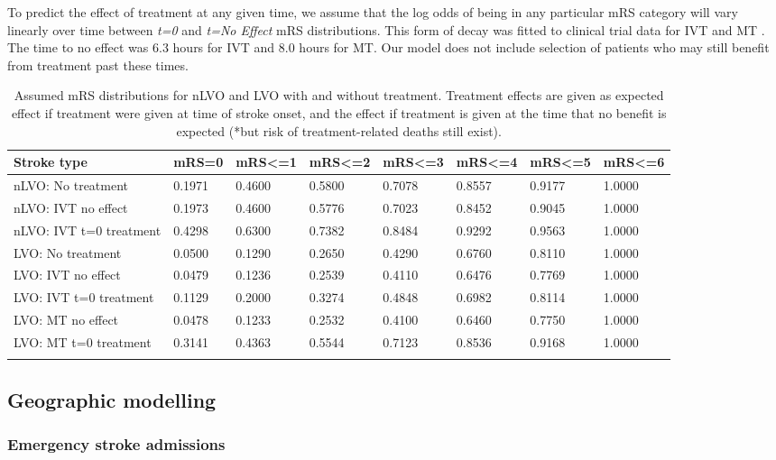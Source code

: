 To predict the effect of treatment at any given time, we assume that the log odds of being in any particular mRS category will vary linearly over time between \textit{t=0} and \textit{t=No Effect} mRS distributions. This form of decay was fitted to clinical trial data for IVT \cite{emberson_effect_2014} and MT \cite{fransen_time_2016}. The time to no effect was 6.3 hours for IVT and 8.0 hours for MT. Our model does not include selection of patients who may still benefit from treatment past these times.

\begin{minipage}{\textwidth}
\begin{longtable}[]{@{}llllllll@{}}
\caption{Assumed mRS distributions for nLVO and LVO with and without treatment. Treatment effects are given as expected effect if treatment were given at time of stroke onset, and the effect if treatment is given at the time that no benefit is expected (*but risk of treatment-related deaths still exist).}\\
\toprule
\endhead
Stroke type & mRS=0 & mRS\textless=1 & mRS\textless=2 & mRS\textless=3 & mRS\textless=4 & mRS\textless=5 & mRS\textless=6\tabularnewline
\midrule
nLVO: No treatment & 0.1971 & 0.4600 & 0.5800 & 0.7078 & 0.8557 & 0.9177 & 1.0000\tabularnewline
nLVO: IVT no effect & 0.1973 & 0.4600 & 0.5776 & 0.7023 & 0.8452 & 0.9045 & 1.0000\tabularnewline
nLVO: IVT t=0 treatment & 0.4298 & 0.6300 & 0.7382 & 0.8484 & 0.9292 & 0.9563 & 1.0000\tabularnewline
LVO: No treatment & 0.0500 & 0.1290 & 0.2650 & 0.4290 & 0.6760 & 0.8110 & 1.0000\tabularnewline
LVO: IVT no effect & 0.0479 & 0.1236 & 0.2539 & 0.4110 & 0.6476 & 0.7769 & 1.0000\tabularnewline
LVO: IVT t=0 treatment & 0.1129 & 0.2000 & 0.3274 & 0.4848 & 0.6982 & 0.8114 & 1.0000\tabularnewline
LVO: MT no effect & 0.0478 & 0.1233 & 0.2532 & 0.4100 & 0.6460 & 0.7750 & 1.0000\tabularnewline
LVO: MT t=0 treatment & 0.3141 & 0.4363 & 0.5544 & 0.7123 & 0.8536 & 0.9168 & 1.0000\tabularnewline
\bottomrule
\label{tab:mrs_dists}
\end{longtable}
\end{minipage}

\subsection{Geographic modelling}

\subsubsection{Emergency stroke admissions}

